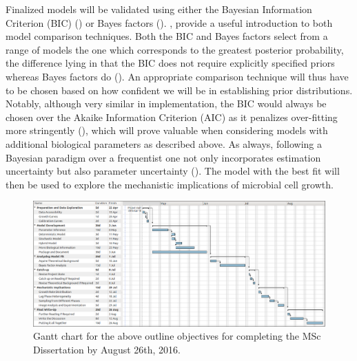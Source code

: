 \documentclass{bioinfo}
\begin{document}
Finalized models will be validated using either the Bayesian Information Criterion (BIC) (\citealp{Schwarz78}) or Bayes factors (\citealp{Kass95}). \citealp{Christensen11}, provide a useful introduction to both model comparison techniques. Both the BIC and Bayes factors select from a range of models the one which corresponds to the greatest posterior probability, the difference lying in that the BIC does not require explicitly specified priors whereas Bayes factors do (\citealp{Bollen12}). An appropriate comparison technique will thus have to be chosen based on how confident we will be in establishing prior distributions. Notably, although very similar in implementation, the BIC would always be chosen over the Akaike Information Criterion (AIC) as it penalizes over-fitting more stringently (\citealp{Burnham02}), which will prove valuable when considering models with additional biological parameters as described above. As always, following a Bayesian paradigm over a frequentist one not only incorporates estimation uncertainty but also parameter uncertainty (\citealp{Christensen11}). The model with the best fit will then be used to explore the mechanistic implications of microbial cell growth. 


\begin{figure}[hb!]
\vspace{-1em}
\centering
\includegraphics[width=1\linewidth]{GanttChart.png}
\caption{Gantt chart for the above outline objectives for completing the MSc Dissertation by August 26th, 2016.}
\label{fig:GanttChart}
\vspace{-0.5em}
\end{figure}
\end{document}
